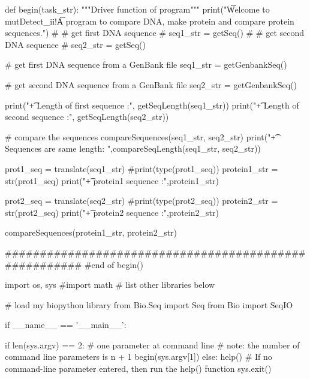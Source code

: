 def begin(task_str):
    """Driver function of program"""
    print("\n\t Welcome to mutDetect_ii!\n\t A program to compare DNA, make protein and compare protein sequences.")
# # get first DNA sequence
#     seq1_str = getSeq()
# # get second DNA sequence
#     seq2_str = getSeq()

#   get first DNA sequence from a GenBank file
    seq1_str = getGenbankSeq()

#   get second DNA sequence from a GenBank file
    seq2_str = getGenbankSeq()

    print("\t + Length of first sequence  :", getSeqLength(seq1_str))
    print("\t + Length of second sequence :", getSeqLength(seq2_str))

# compare the sequences
    compareSequences(seq1_str, seq2_str)
    print("\t + Sequences are same length: ",compareSeqLength(seq1_str, seq2_str))

    prot1_seq = translate(seq1_str)
    #print(type(prot1_seq))
    protein1_str = str(prot1_seq)
    print("\t + protein1 sequence  :",protein1_str)

    prot2_seq = translate(seq2_str)
    #print(type(prot2_seq))
    protein2_str = str(prot2_seq)
    print("\t + protein2 sequence  :",protein2_str)

    compareSequences(protein1_str, protein2_str)

######################################################
#end of begin()



import os, sys
#import math
# list other libraries below

# load my biopython library
from Bio.Seq import Seq
from Bio import SeqIO

if __name__ == '__main__':

        if len(sys.argv) == 2: # one parameter at command line
        # note: the number of command line parameters is n + 1
                begin(sys.argv[1])
        else:
                help() # If no command-line parameter entered, then run the help() function
                sys.exit()











